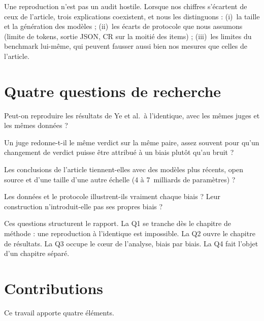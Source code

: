 Une reproduction n'est pas un audit hostile. Lorsque nos chiffres s'écartent de ceux de l'article, trois explications coexistent, et nous les distinguons : (i)~la taille et la génération des modèles ; (ii)~les écarts de protocole que nous assumons (limite de tokens, sortie JSON, CR sur la moitié des items) ; (iii)~les limites du benchmark lui-même, qui peuvent fausser aussi bien nos mesures que celles de l'article.

\section{Quatre questions de recherche}

\begin{description}[style=nextline,leftmargin=1.6em]
  \item[Q1 --- Mêmes modèles, mêmes données.]
    Peut-on reproduire les résultats de Ye et al.\ à l'identique, avec les mêmes juges et les mêmes données ?
  \item[Q2 --- Stabilité.]
    Un juge redonne-t-il le même verdict sur la même paire, assez souvent pour qu'un changement de verdict puisse être attribué à un biais plutôt qu'au bruit ?
  \item[Q3 --- Modèles récents.]
    Les conclusions de l'article tiennent-elles avec des modèles plus récents, open source et d'une taille d'une autre échelle (4 à 7~milliards de paramètres) ?
  \item[Q4 --- Qualité du benchmark.]
    Les données et le protocole illustrent-ils vraiment chaque biais ? Leur construction n'introduit-elle pas ses propres biais ?
\end{description}

Ces questions structurent le rapport. La Q1 se tranche dès le chapitre de méthode : une reproduction à l'identique est impossible. La Q2 ouvre le chapitre de résultats. La Q3 occupe le cœur de l'analyse, biais par biais. La Q4 fait l'objet d'un chapitre séparé.

\section{Contributions}

Ce travail apporte quatre éléments.

